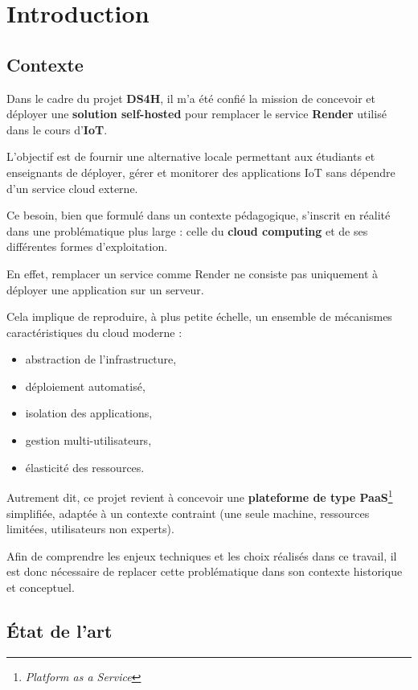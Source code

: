 \documentclass{rapportClass} %
\begin{document}
\chapter{Introduction}
\section{Contexte}  
Dans le cadre du projet \textbf{DS4H}, il m'a été confié la mission de
concevoir et déployer une \textbf{solution self-hosted} pour remplacer
le service \textbf{Render} utilisé dans le cours d'\textbf{IoT}.

L'objectif est de fournir une alternative locale %
permettant aux étudiants et enseignants de déployer, gérer
et monitorer des applications IoT sans dépendre d'un service cloud
externe.

Ce besoin, bien que formulé dans un contexte pédagogique, s'inscrit en
réalité dans une problématique plus large : celle du \textbf{cloud
computing} et de ses différentes formes d'exploitation.

En effet, remplacer un service comme Render ne consiste pas uniquement
à déployer une application sur un serveur. 

Cela implique de reproduire, à plus petite échelle, un ensemble de
mécanismes caractéristiques du cloud moderne :
\begin{itemize}
\item abstraction de l'infrastructure,
\item déploiement automatisé, 
\item isolation des applications,
\item gestion multi-utilisateurs,
\item élasticité des ressources.
\end{itemize}

Autrement dit, ce projet revient à concevoir une \textbf{plateforme de
type PaaS}\footnote{\textit{Platform as a Service}} simplifiée, adaptée à un contexte
contraint (une seule machine, ressources limitées, utilisateurs non
experts).

Afin de comprendre les enjeux techniques et les choix réalisés dans ce
travail, il est donc nécessaire de replacer cette problématique dans
son contexte historique et conceptuel.

\section{État de l'art}
\end{document}
